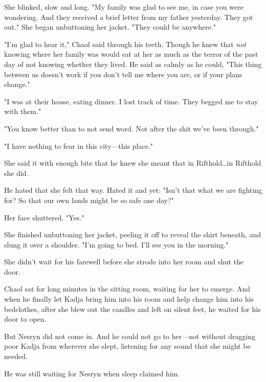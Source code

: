 She blinked, slow and long.
"My family was glad to see me, in case you were wondering.
And they received a brief letter from my father yesterday.
They got out."
She began unbuttoning her jacket.
"They could be anywhere."

"I'm glad to hear it," Chaol said through his teeth.
Though he knew that \emph{not} knowing where her family was would eat at her as much as the terror of the past day of not knowing whether they lived.
He said as calmly as he could, "This thing between us doesn't work if you don't tell me where you are, or if your plans change."

"I was at their house, eating dinner.
I lost track of time.
They begged me to stay with them."

"You know better than to not send word.
Not after the shit we've been through."

"I have nothing to fear in this city---this place."

She said it with enough bite that he knew she meant that in Rifthold\dots in Rifthold she did.

He hated that she felt that way.
Hated it and yet: "Isn't that what we are fighting for?
So that our own lands might be so safe one day?"

Her face shuttered.
"Yes."

She finished unbuttoning her jacket, peeling it off to reveal the shirt beneath, and slung it over a shoulder.
"I'm going to bed.
I'll see you in the morning."

She didn't wait for his farewell before she strode into her room and shut the door.

Chaol sat for long minutes in the sitting room, waiting for her to emerge.
And when he finally let Kadja bring him into his room and help change him into his bedclothes, after she blew out the candles and left on silent feet, he waited for his door to open.

But Nesryn did not come in.
And he could not go to her---not without dragging poor Kadja from wherever she slept, listening for any sound that she might be needed.

He was still waiting for Nesryn when sleep claimed him.

